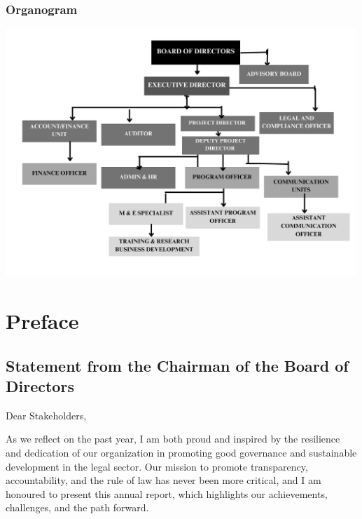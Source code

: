 \documentclass[
  letterpaper,
  DIV=11,
  numbers=noendperiod]{scrreprt}
\begin{document}
\section*{Organogram}\label{organogram}


\begin{center}
\includegraphics[width=5.20833in,height=\textheight,keepaspectratio]{images/about/organogram.png}
\end{center}

\part{Preface}

\chapter*{Statement from the Chairman of the Board of
Directors}\label{statement-from-the-chairman-of-the-board-of-directors}


Dear Stakeholders,

As we reflect on the past year, I am both proud and inspired by the
resilience and dedication of our organization in promoting good
governance and sustainable development in the legal sector. Our mission
to promote transparency, accountability, and the rule of law has never
been more critical, and I am honoured to present this annual report,
which highlights our achievements, challenges, and the path forward.
\end{document}
